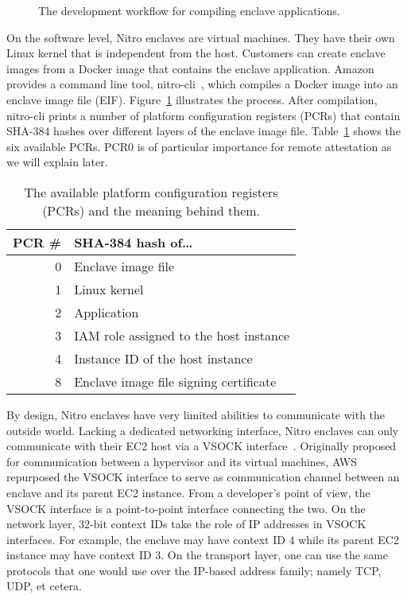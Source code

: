 \begin{figure}[t]
  \centering
  
  \caption{The development workflow for compiling enclave applications.}%
  \label{fig:dev-workflow}
\end{figure}

On the software level, Nitro enclaves are virtual machines.  They have their own
Linux kernel that is independent from the host.  Customers can create enclave
images from a Docker image that contains the enclave application.  Amazon
provides a command line tool, nitro-cli~\cite{nitro-cli}, which compiles a
Docker image into an enclave image file (EIF).  Figure~\ref{fig:dev-workflow}
illustrates the process.  After compilation, nitro-cli prints a number of
platform configuration registers (PCRs) that contain SHA-384 hashes over
different layers of the enclave image file.  Table~\ref{tab:pcr} shows the six
available PCRs.  PCR0 is of particular importance for remote attestation as we
will explain later.

\begin{table}[t]
    \centering
    \begin{tabular}{r l}
    \toprule
      PCR \# & SHA-384 hash of\ldots \\
    \midrule
      0 & Enclave image file \\
      1 & Linux kernel \\
      2 & Application \\
      3 & IAM role assigned to the host instance \\
      4 & Instance ID of the host instance \\
      8 & Enclave image file signing certificate \\
    \bottomrule
    \end{tabular}
    \caption{The available platform configuration registers (PCRs) and the
    meaning behind them.}%
    \label{tab:pcr}
\end{table}

By design, Nitro enclaves have very limited abilities to communicate with the
outside world.  Lacking a dedicated networking interface, Nitro enclaves can
only communicate with their EC2 host via a VSOCK interface~\cite{vsock}.
Originally proposed for communication between a hypervisor and its virtual
machines, AWS repurposed the VSOCK interface to serve as communication channel
between an enclave and its parent EC2 instance.  From a developer's point of
view, the VSOCK interface is a point-to-point interface connecting the two.  On
the network layer, 32-bit context IDs take the role of IP addresses in VSOCK
interfaces.  For example, the enclave may have context ID 4 while its parent EC2
instance may have context ID 3.  On the transport layer, one can use the same
protocols that one would use over the IP-based address family; namely TCP, UDP,
et cetera.

